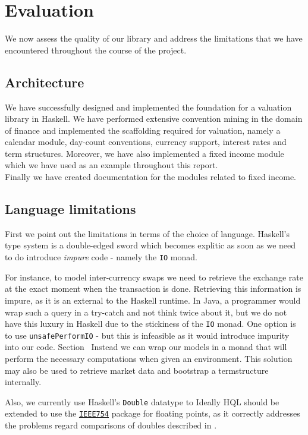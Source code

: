 \chapter{Evaluation}

We now assess the quality of our library and address the limitations that we
have encountered throughout the course of the project.

\section{Architecture}

We have successfully designed and implemented the foundation for a valuation 
library in Haskell. We have performed extensive convention mining in the domain
of finance and implemented the scaffolding required for valuation, 
namely a calendar module, day-count conventions, currency support, interest 
rates and term structures. Moreover, we have also implemented a fixed income 
module which we have used as an example throughout this report.\\

Finally we have created documentation for the modules related to fixed 
income\cite{hqldoc}.

\section{Language limitations}

First we point out the limitations in terms of the choice of language.
Haskell's type system is a double-edged sword which becomes explitic as soon 
as we need to do introduce \emph{impure} code - namely the \texttt{IO} monad.

For instance, to model inter-currency swaps we need to retrieve the exchange 
rate at the exact moment when the transaction is done. Retrieving this 
information is impure, as it is an external to the Haskell runtime. In Java, a 
programmer would wrap such a query in a try-catch and not think twice about it, 
but we do not have this luxury in Haskell due to the stickiness of the 
\texttt{IO} monad. One option is to use \texttt{unsafePerformIO} - but this is 
infeasible as it would introduce impurity into our code.
Section \ Instead we can wrap our models in a monad that will perform the necessary 
computations when given an environment. This solution may also be used to 
retrieve market data and bootstrap a termstructure internally.

Also, we currently use Haskell's \texttt{Double} datatype to 
Ideally HQL should be extended to use the \href{https://hackage.haskell.org/package/data-binary-ieee754}{\texttt{IEEE754}} package for floating 
points, as it correctly addresses the problems regard comparisons of 
doubles described in \cite{blogpost}.

